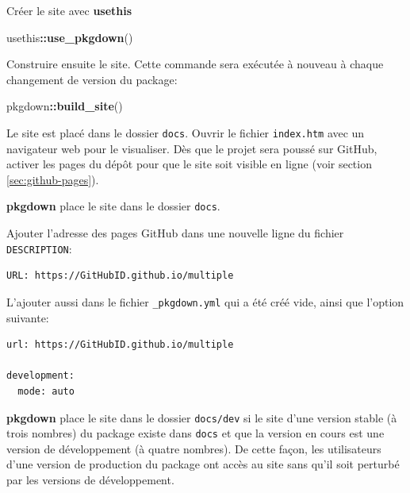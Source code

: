 \documentclass[
  12pt,
  french,
  a4paper,
  extrafontsizes,onecolumn,openright
  ]{memoir}
\newenvironment{Shaded}{\begin{snugshade}}{\end{snugshade}}
\newcommand{\KeywordTok}[1]{\textcolor[rgb]{0.13,0.29,0.53}{\textbf{#1}}}
\newcommand{\NormalTok}[1]{#1}
\newcommand{\OperatorTok}[1]{\textcolor[rgb]{0.81,0.36,0.00}{\textbf{#1}}}
\begin{document}
Créer le site avec \textbf{usethis}

\scriptsize

\begin{Shaded}
\begin{Highlighting}[]
\NormalTok{usethis}\OperatorTok{::}\KeywordTok{use_pkgdown}\NormalTok{()}
\end{Highlighting}
\end{Shaded}

\normalsize

Construire ensuite le site.
Cette commande sera exécutée à nouveau à chaque changement de version du package:

\scriptsize

\begin{Shaded}
\begin{Highlighting}[]
\NormalTok{pkgdown}\OperatorTok{::}\KeywordTok{build_site}\NormalTok{()}
\end{Highlighting}
\end{Shaded}

\normalsize

Le site est placé dans le dossier \texttt{docs}.
Ouvrir le fichier \texttt{index.htm} avec un navigateur web pour le visualiser.
Dès que le projet sera poussé sur GitHub, activer les pages du dépôt pour que le site soit visible en ligne (voir section \ref{sec:github-pages}).

\textbf{pkgdown} place le site dans le dossier \texttt{docs}.

Ajouter l'adresse des pages GitHub dans une nouvelle ligne du fichier \texttt{DESCRIPTION}:

\begin{verbatim}
URL: https://GitHubID.github.io/multiple
\end{verbatim}

L'ajouter aussi dans le fichier \texttt{\_pkgdown.yml} qui a été créé vide, ainsi que l'option suivante:

\begin{verbatim}
url: https://GitHubID.github.io/multiple

development:
  mode: auto
\end{verbatim}

\textbf{pkgdown} place le site dans le dossier \texttt{docs/dev} si le site d'une version stable (à trois nombres) du package existe dans \texttt{docs} et que la version en cours est une version de développement (à quatre nombres).
De cette façon, les utilisateurs d'une version de production du package ont accès au site sans qu'il soit perturbé par les versions de développement.
\end{document}
